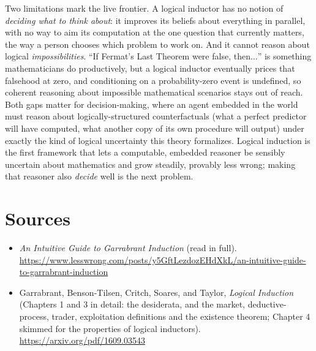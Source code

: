 \documentclass[10pt]{article}
\theoremstyle{definition}
\theoremstyle{remark}
\begin{document}
Two limitations mark the live frontier. A logical inductor has no notion of \emph{deciding what to think about}: it improves its beliefs about everything in parallel, with no way to aim its computation at the one question that currently matters, the way a person chooses which problem to work on. And it cannot reason about logical \emph{impossibilities}. ``If Fermat's Last Theorem were false, then$\dots$'' is something mathematicians do productively, but a logical inductor eventually prices that falsehood at zero, and conditioning on a probability-zero event is undefined, so coherent reasoning about impossible mathematical scenarios stays out of reach. Both gaps matter for decision-making, where an agent embedded in the world must reason about logically-structured counterfactuals (what a perfect predictor will have computed, what another copy of its own procedure will output) under exactly the kind of logical uncertainty this theory formalizes. Logical induction is the first framework that lets a computable, embedded reasoner be sensibly uncertain about mathematics and grow steadily, provably less wrong; making that reasoner also \emph{decide} well is the next problem.

\section*{Sources}

\begin{itemize}[leftmargin=1.5em]
\item \emph{An Intuitive Guide to Garrabrant Induction} (read in full). \url{https://www.lesswrong.com/posts/y5GftLezdozEHdXkL/an-intuitive-guide-to-garrabrant-induction}
\item Garrabrant, Benson-Tilsen, Critch, Soares, and Taylor, \emph{Logical Induction} (Chapters 1 and 3 in detail: the desiderata, and the market, deductive-process, trader, exploitation definitions and the existence theorem; Chapter 4 skimmed for the properties of logical inductors). \url{https://arxiv.org/pdf/1609.03543}
\end{itemize}
\end{document}
